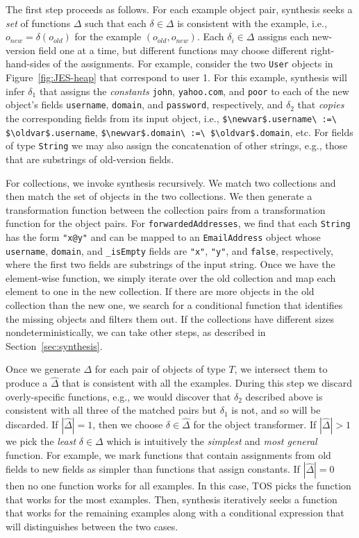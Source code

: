 \documentclass[natbib]{sigplanconf}
\newcommand{\code}[1]{\lstinline|#1|\xspace}
\newcommand{\TOS}{TOS\xspace}
\begin{document}
The first step proceeds as follows.  For each example object pair,
synthesis seeks a \emph{set} of functions $\Delta$ such that each
$\delta \in \Delta$ is consistent with the example, i.e., $o_{new} =
\delta(o_{old})$ for the example $(o_{old},o_{new})$.
Each $\delta_i \in \Delta$ assigns each new-version field one at a
time, but different functions may choose different right-hand-sides of
the assignments.  For example, consider the two \code{User} objects in
Figure~\ref{fig:JES-heap} that correspond to \textsf{user 1}.  For
this example, synthesis will infer $\delta_1$ that assigns the
\emph{constants} \code{john}, \code{yahoo.com}, and \code{poor} to
each of the new object's fields \code{username}, \code{domain}, and
\code{password}, respectively, and $\delta_2$ that \emph{copies} the
corresponding fields from its input object, i.e.,
\code{$\newvar$.username\ :=\ $\oldvar$.username},
\code{$\newvar$.domain\ :=\ $\oldvar$.domain}, etc.  For fields of type
\code{String} we may also assign the concatenation of other strings,
e.g., those that are substrings of old-version fields.

For collections, we invoke synthesis recursively.  We match two
collections and then match the set of objects in the two
collections. We then generate a transformation function between the
collection pairs from a transformation function for the object pairs.  For
\code{forwardedAddresses}, we find that each \code{String} has the
form \code{"x@y"} and can be mapped to an \code{EmailAddress} object
whose \code{username}, \code{domain}, and \code{_isEmpty} fields are
\code{"x"}, \code{"y"}, and \code{false}, respectively, where the
first two fields are substrings of the input string.  Once we have the
element-wise function, we simply iterate over the old collection and
map each element to one in the new collection.  If there are more
objects in the old collection than the new one, we search for a
conditional function that identifies the missing objects and filters
them out.  If the collections have different sizes
nondeterministically, we can take other steps, as described in
Section~\ref{sec:synthesis}.

Once we generate $\Delta$ for each pair of objects of type  $T$, we
intersect them to produce a $\hat{\Delta}$ that
is consistent with all the examples.  During this step we discard
overly-specific functions, e.g., we would discover that $\delta_2$
described above is consistent with 
all three of the matched pairs but $\delta_1$ is not, and so will be
discarded.  If $|\hat{\Delta}| =
1$, then we choose $\delta \in \hat{\Delta}$ for the object transformer.  If
$|\hat{\Delta}| > 1$ we pick the \emph{least} $\delta \in \Delta$
which is intuitively the \emph{simplest} and \emph{most general}
function.  For example, we mark functions that contain assignments from old
fields to new fields as simpler than functions that assign
constants.  If $|\hat{\Delta}| = 0$ then no one function
works for all examples.  In this case, \TOS picks the function that
works for the most examples.  Then,  synthesis iteratively seeks a function that
works for the remaining examples along with a conditional expression
that will distinguishes between the two cases.
\end{document}
